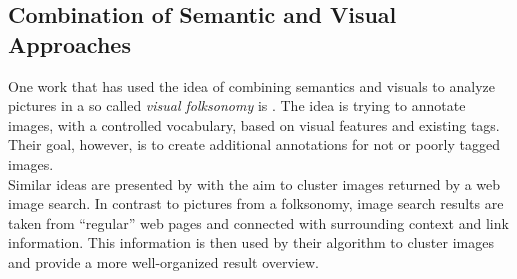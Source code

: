 \subsection{Combination of Semantic and Visual Approaches}

One work that has used the idea of combining semantics and visuals to analyze pictures in a so called \emph{visual folksonomy} is \cite{Lindstaedt2009}. The idea is trying to annotate images, with a controlled vocabulary, based on visual features and existing tags. Their goal, however, is to create additional annotations for not or poorly tagged images. \\
Similar ideas are presented by \cite{cai2004hierarchical} with the aim to cluster images returned by a web image search. In contrast to pictures from a folksonomy, image search results are taken from ``regular'' web pages and connected with surrounding context and link information. This information is then used by their algorithm to cluster images and provide a more well-organized result overview.
